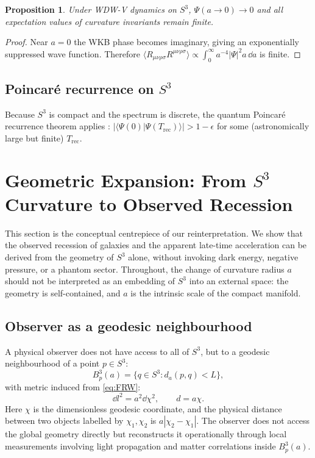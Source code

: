 \documentclass[12pt,a4paper]{article}
\theoremstyle{plain}
\newtheorem{proposition}[theorem]{Proposition}
\theoremstyle{definition}
\begin{document}
\begin{proposition}
\label{prop:no_singularity}
Under WDW-V dynamics on $S^3$, $\Psi(a\to 0)\to 0$ and all expectation
values of curvature invariants remain finite.
\end{proposition}

\begin{proof}
Near $a=0$ the WKB phase becomes imaginary, giving an exponentially
suppressed wave function. Therefore
$\langle R_{\mu\nu\rho\sigma}R^{\mu\nu\rho\sigma}\rangle
\propto \int_0^\infty a^{-4}|\Psi|^2 a\,\dd a$ is finite.
\end{proof}

\subsection{Poincar\'e recurrence on $S^3$}

Because $S^3$ is compact and the spectrum is discrete, the quantum
Poincar\'e recurrence theorem applies \cite{Schulman1978}:
$|\langle\Psi(0)|\Psi(T_{\mathrm{rec}})\rangle| > 1-\epsilon$ for some
(astronomically large but finite) $T_{\mathrm{rec}}$.

\section{Geometric Expansion: From $S^3$ Curvature to Observed Recession}
\label{sec:geometric}

This section is the conceptual centrepiece of our reinterpretation.
We show that the observed recession of galaxies and the apparent late-time
acceleration can be derived from the geometry of $S^3$ alone, without
invoking dark energy, negative pressure, or a phantom sector.
Throughout, the change of curvature radius $a$ should not be interpreted
as an embedding of $S^3$ into an external space: the geometry is
self-contained, and $a$ is the intrinsic scale of the compact manifold.

\subsection{Observer as a geodesic neighbourhood}

A physical observer does not have access to all of $S^3$, but to a
geodesic neighbourhood of a point $p\in S^3$:
\begin{equation}
  B^3_p(a) = \{q\in S^3: d_a(p,q) < L\},
  \label{eq:geodesic_ball}
\end{equation}
with metric induced from \eqref{eq:FRW}:
\begin{equation}
  \dd l^2 = a^2\dd\chi^2, \qquad d = a\chi.
  \label{eq:metric_local}
\end{equation}
Here $\chi$ is the dimensionless geodesic coordinate, and the physical
distance between two objects labelled by $\chi_1,\chi_2$ is
$a|\chi_2-\chi_1|$.
The observer does not access the global geometry directly but
reconstructs it operationally through local measurements involving light
propagation and matter correlations inside $B^3_p(a)$.
\end{document}
